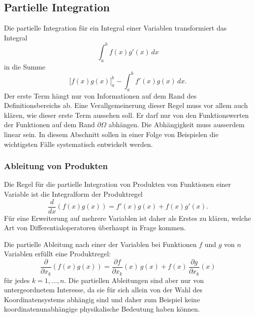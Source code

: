 %
%
%

%
%
\subsection{Partielle Integration
\label{buch:felder:subsection:partint}}
Die partielle Integration für ein Integral einer Variablen
transformiert das Integral
\[
\int_{a}^{b} f(x) g'(x)\,dx
\]
in die Summe
\[
\biggl[ f(x) g(x) \biggr]_a^b
-
\int_a^b f'(x) g(x)\,dx.
\]
Der erste Term hängt nur von Informationen auf dem Rand des 
Definitionsbereichs ab.
Eine Verallgemeinerung dieser Regel muss vor allem auch klären,
wie dieser erste Term aussehen soll.
Er darf nur von den Funktionswerten der Funktionen auf dem Rand
$\partial\Omega$ abhängen.
Die Abhängigkeit muss ausserdem linear sein.
In diesem Abschnitt sollen in einer Folge von Beispielen die
wichtigsten Fälle systematisch entwickelt werden.

%
%
\subsubsection{Ableitung von Produkten}
Die Regel für die partielle Integration von Produkten von Funktionen
einer Variable ist die Integralform der Produktregel
\[
\frac{d}{dx}(f(x)g(x)) = f'(x)g(x) + f(x)g'(x).
\]
Für eine Erweiterung auf mehrere Variablen ist daher als Erstes zu klären,
welche Art von Differentialoperatoren überhaupt in Frage kommen.

Die partielle Ableitung nach einer der Variablen bei Funktionen
$f$ und $g$ von $n$ Variablen erfüllt eine Produktregel:
\[
\frac{\partial}{\partial x_k}
(f(x)g(x))
=
\frac{\partial f}{\partial x_k}(x)\,g(x)
+
f(x)
\,
\frac{\partial g}{\partial x_k}(x)
\]
für jedes $k=1,\dots,n$.
Die partiellen Ableitungen sind aber nur von untergeordnetem Interesse,
da sie für sich allein von der Wahl des Koordinatensystems abhängig 
sind und daher zum Beispiel keine koordinatenunabhängige physikalische
Bedeutung haben können.

